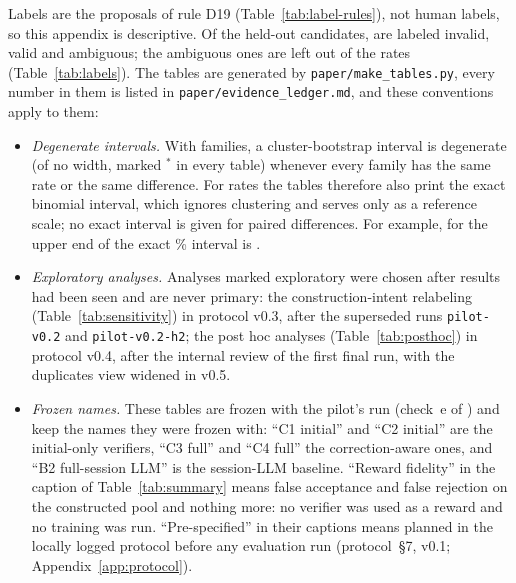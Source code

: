 Labels are the proposals of rule D19 (Table~\ref{tab:label-rules}), not human labels, so this appendix is descriptive.
Of the  held-out candidates,  are labeled invalid,  valid and
 ambiguous; the ambiguous ones are left out of the rates (Table~\ref{tab:labels}). The tables are
generated by \texttt{paper/make\_tables.py}, every number in them is listed in \texttt{paper/evidence\_ledger.md}, and these
conventions apply to them:
\begin{itemize}
\item \emph{Degenerate intervals.} With  families, a cluster-bootstrap interval is degenerate (of no
  width, marked $^{*}$ in every table) whenever every family has the same rate or the same difference. For rates the
  tables therefore also print the exact binomial interval, which ignores clustering and serves only as a reference scale;
  no exact interval is given for paired differences. For example, for  the upper end of the exact
  \% interval is .
\item \emph{Exploratory analyses.} Analyses marked exploratory were chosen after results had been seen and are never
  primary: the construction-intent relabeling (Table~\ref{tab:sensitivity}) in protocol v0.3, after the superseded runs
  \texttt{pilot-v0.2} and \texttt{pilot-v0.2-h2}; the post hoc analyses (Table~\ref{tab:posthoc}) in protocol v0.4,
  after the internal review of the first final run, with the duplicates view widened in v0.5.
\item \emph{Frozen names.} These tables are frozen with the pilot's run (check~e of
  ) and keep the names they were frozen with: ``C1 initial'' and ``C2 initial'' are the initial-only verifiers,
  ``C3 full'' and ``C4 full'' the correction-aware ones, and ``B2 full-session LLM'' is the session-LLM baseline.
  ``Reward fidelity'' in the caption of Table~\ref{tab:summary} means false acceptance and false rejection on the
  constructed pool and nothing more: no verifier was used as a reward and no training was run. ``Pre-specified'' in
  their captions means planned in the locally logged protocol before any evaluation run (protocol~\S7, v0.1;
  Appendix~\ref{app:protocol}).
\end{itemize}


